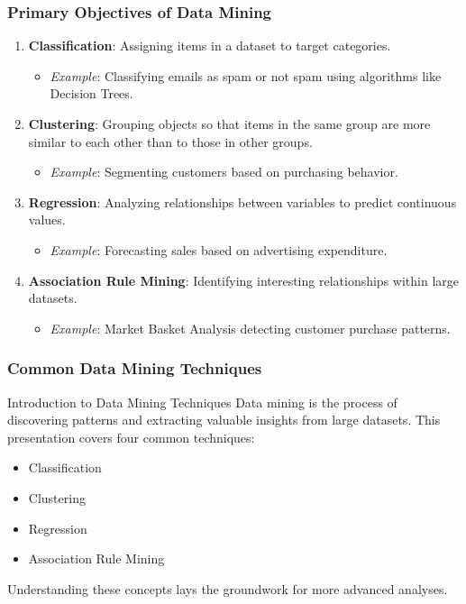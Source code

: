 \documentclass[aspectratio=169]{beamer}
\begin{document}
\begin{frame}[fragile]
    \frametitle{Primary Objectives of Data Mining}
    \begin{enumerate}
        \item \textbf{Classification}: Assigning items in a dataset to target categories.
            \begin{itemize}
                \item \textit{Example}: Classifying emails as spam or not spam using algorithms like Decision Trees.
            \end{itemize}
        
        \item \textbf{Clustering}: Grouping objects so that items in the same group are more similar to each other than to those in other groups.
            \begin{itemize}
                \item \textit{Example}: Segmenting customers based on purchasing behavior.
            \end{itemize}
    
        \item \textbf{Regression}: Analyzing relationships between variables to predict continuous values.
            \begin{itemize}
                \item \textit{Example}: Forecasting sales based on advertising expenditure.
            \end{itemize}
    
        \item \textbf{Association Rule Mining}: Identifying interesting relationships within large datasets.
            \begin{itemize}
                \item \textit{Example}: Market Basket Analysis detecting customer purchase patterns.
            \end{itemize}
    \end{enumerate}
\end{frame}

\begin{frame}[fragile]
    \frametitle{Common Data Mining Techniques}
    \begin{block}{Introduction to Data Mining Techniques}
        Data mining is the process of discovering patterns and extracting valuable insights from large datasets. This presentation covers four common techniques:
        \begin{itemize}
            \item Classification
            \item Clustering
            \item Regression
            \item Association Rule Mining
        \end{itemize}
        Understanding these concepts lays the groundwork for more advanced analyses.
    \end{block}
\end{frame}
\end{document}
